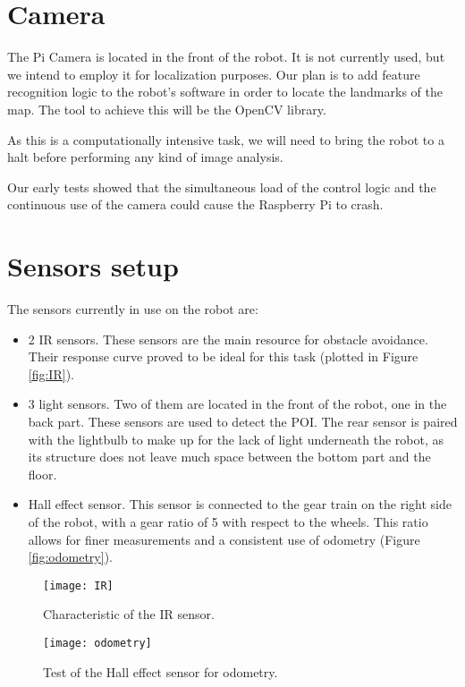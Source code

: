 \documentclass{article}
\begin{document}
\section*{Camera}

The Pi Camera is located in the front of the robot. It is not currently used, but we intend to employ it for localization purposes. Our plan is to add feature recognition logic to the robot's software in order to locate the landmarks of the map. The tool to achieve this will be the OpenCV library.

As this is a computationally intensive task, we will need to bring the robot to a halt before performing any kind of image analysis.

Our early tests showed that the simultaneous load of the control logic and the continuous use of the camera could cause the Raspberry Pi to crash.

\section*{Sensors setup} 

The sensors currently in use on the robot are:

\begin{itemize}
\item 2 IR sensors. These sensors are the main resource for obstacle avoidance. Their response curve proved to be ideal for this task (plotted in Figure \ref{fig:IR}).
\item 3 light sensors. Two of them are located in the front of the robot, one in the back part. These sensors are used to detect the POI. The rear sensor is paired with the lightbulb to make up for the lack of light underneath the robot, as its structure does not leave much space between the bottom part and the floor.
\item Hall effect sensor. This sensor is connected to the gear train on the right side of the robot, with a gear ratio of 5 with respect to the wheels. This ratio allows for finer measurements and a consistent use of odometry (Figure \ref{fig:odometry}).
\end{itemize}

\begin{figure}[h]
\centering
\begin{minipage}{.5\textwidth}
\texttt{[image: IR]}
\caption{Characteristic of the IR sensor.}
\label{fig:IR}
\end{minipage}%
\begin{minipage}{.5\textwidth}
  \centering
  \texttt{[image: odometry]}
  \caption{Test of the Hall effect sensor for odometry.}
  \label{fig:odometry}
\end{minipage}
\label{fig:CKScan1}
\end{figure}
 
\end{document}
